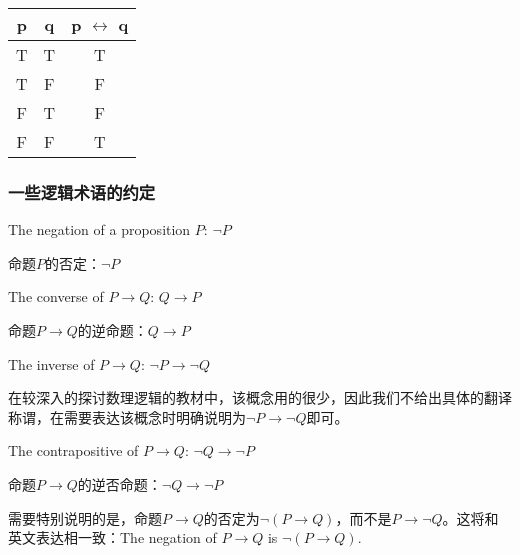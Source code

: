 \documentclass{beamer}
\begin{document}
\begin{CJK*}{UTF8}{gbsn}
\begin{frame}
  \begin{tabular}{cc|c}
    p& q& p $\leftrightarrow$ q\\
    \hline
    T&T&T\\
    T&F&F\\
    F&T&F\\
    F&F&T\\
  \end{tabular}
\end{frame}

\begin{frame}
    \frametitle{一些逻辑术语的约定}
    The negation of a proposition $P$: $\lnot P$

  命题$P$的否定：$\lnot P$

  The converse of $P\to Q$: $Q \to P$

  命题$P\to Q$的逆命题：$Q\to P$



  The inverse of $P\to Q$: $\lnot P \to \lnot Q$
  
  在较深入的探讨数理逻辑的教材中，该概念用的很少，因此我们不给出具体的翻译称谓，在需要表达该概念时明确说明为$\lnot P \to \lnot Q$即可。

  
  The contrapositive of $P\to Q$: $\lnot Q \to \lnot P$

  命题$P\to Q$的逆否命题：$\lnot Q \to \lnot P$

  需要特别说明的是，命题$P\to Q$的否定为$\lnot (P \to Q)$，而不是$P \to \lnot Q$。这将和英文表达相一致：The negation of $P\to Q$ is $\lnot (P \to Q)$. 
\end{frame}
\end{CJK*}
\end{document}
